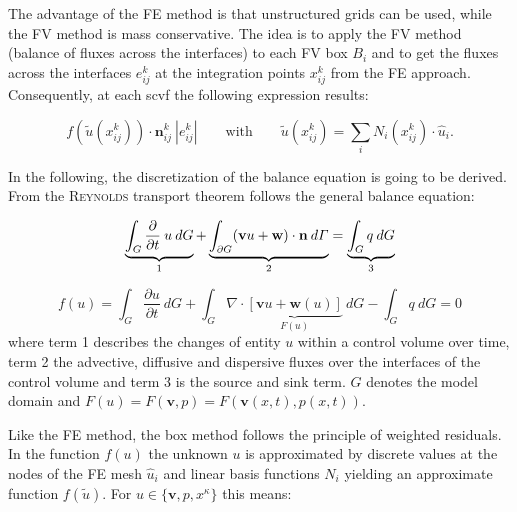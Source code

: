 The advantage of the FE method is that unstructured grids can be used, while the
FV method is mass conservative. The idea is to apply the FV method (balance of
fluxes across the interfaces) to each FV box $B_i$  and to get the fluxes across
the interfaces $e^k_{ij}$ at the integration points $x^k_{ij}$ from the FE approach.
Consequently, at each scvf the following expression results:

\begin{equation}
 	f(\tilde u(x^k_{ij})) \cdot \mathbf n^k_{ij} \: |e^k_{ij}| \qquad \textrm{with}
 	\qquad \tilde u(x^k_{ij}) = \sum_i N_i(x^k_{ij}) \cdot \hat u_i .
\end{equation}

In the following, the discretization of the balance equation is going to be derived.
From the \textsc{Reynolds} transport theorem follows the general balance equation:

\begin{equation}
	\underbrace{\int_G \frac{\partial}{\partial t} \: u \: dG}_{1}
	+ \underbrace{\int_{\partial G} (\mathbf{v} u + \mathbf w) \cdot \textbf n \: d\varGamma}_{2} = \underbrace{\int_G q \: dG}_{3}
\end{equation}

\begin{equation}
	f(u) = \int_G \frac{\partial u}{\partial t} \: dG + \int_{G} \nabla \cdot
	\underbrace{\left[  \mathbf{v} u + \mathbf w(u)\right] }_{F(u)}  \: dG - \int_G q \: dG = 0
\end{equation}
where term 1 describes the changes of entity $u$ within a control volume over
time, term 2 the advective, diffusive and dispersive fluxes over the interfaces
of the control volume and term 3 is the source and sink term. $G$ denotes the
model domain and $F(u) = F(\mathbf v, p) = F(\mathbf v(x,t), p(x,t))$.

Like the FE method, the box method follows the principle of weighted residuals.
In the function $f(u)$ the unknown $u$ is approximated by discrete values at the
nodes of the FE mesh $\hat u_i$ and linear basis functions $N_i$ yielding an
approximate function $f(\tilde u)$. For $u\in \lbrace \mathbf v, p, x^\kappa \rbrace$
this means:

